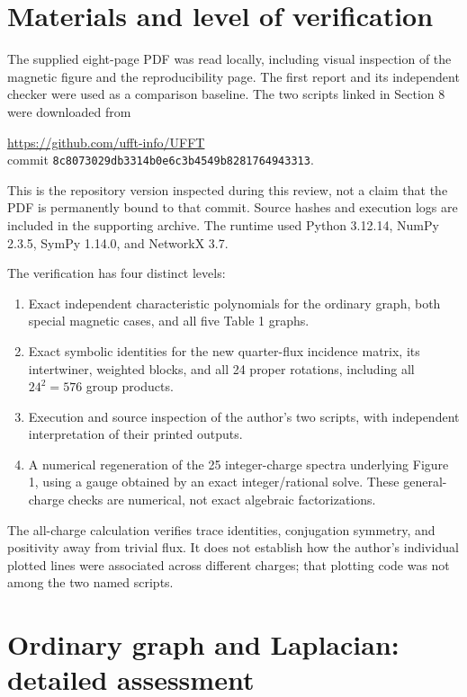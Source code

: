 \documentclass[11pt,a4paper]{article}
\begin{document}
\section{Materials and level of verification}
The supplied eight-page PDF was read locally, including visual inspection of the magnetic figure and the reproducibility page. The first report and its independent checker were used as a comparison baseline. The two scripts linked in Section 8 were downloaded from
\begin{center}\small
\url{https://github.com/ufft-info/UFFT}\\
commit \texttt{8c8073029db3314b0e6c3b4549b8281764943313}.
\end{center}
This is the repository version inspected during this review, not a claim that the PDF is permanently bound to that commit. Source hashes and execution logs are included in the supporting archive. The runtime used Python 3.12.14, NumPy 2.3.5, SymPy 1.14.0, and NetworkX 3.7.

The verification has four distinct levels:
\begin{enumerate}
\item Exact independent characteristic polynomials for the ordinary graph, both special magnetic cases, and all five Table 1 graphs.
\item Exact symbolic identities for the new quarter-flux incidence matrix, its intertwiner, weighted blocks, and all 24 proper rotations, including all $24^2=576$ group products.
\item Execution and source inspection of the author's two scripts, with independent interpretation of their printed outputs.
\item A numerical regeneration of the 25 integer-charge spectra underlying Figure 1, using a gauge obtained by an exact integer/rational solve. These general-charge checks are numerical, not exact algebraic factorizations.
\end{enumerate}
The all-charge calculation verifies trace identities, conjugation symmetry, and positivity away from trivial flux. It does not establish how the author's individual plotted lines were associated across different charges; that plotting code was not among the two named scripts.

\section{Ordinary graph and Laplacian: detailed assessment}
\end{document}
